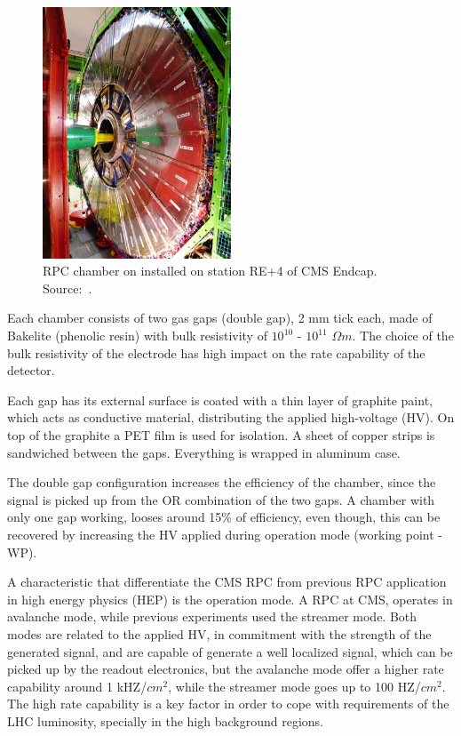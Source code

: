 \begin{figure}[h]
    \begin{center}
    \includegraphics[width=0.5\textwidth,keepaspectratio]{figures_and_tables/rpc/picture_rpc.jpg}
    \end{center}
    \caption{RPC chamber on installed on station RE+4 of CMS Endcap. Source:~\cite{rpc_picture}.}
    \label{picture_rpc}
\end{figure}


Each chamber consists of two gas gaps (double gap), 2 mm tick each, made of Bakelite (phenolic resin) with bulk resistivity of $10^{10}$ - $10^{11}$ $\Omega m$. The choice of the bulk resistivity of the electrode has high impact on the rate capability of the detector.

Each gap has its external surface is coated with a thin layer of graphite paint, which acts as conductive material, distributing the applied high-voltage (HV). On top of the graphite a PET film is used for isolation. A sheet of copper strips is sandwiched between the gaps. Everything is wrapped in aluminum case.

The double gap configuration increases the efficiency of the chamber, since the signal is picked up from the OR combination of the two gaps. A chamber with only one gap working, looses around 15\% of efficiency, even though, this can be recovered by increasing the HV applied during operation mode (working point - WP).

A characteristic that differentiate the CMS RPC from previous RPC application in high energy physics (HEP) is the operation mode. A RPC at CMS, operates in avalanche mode, while previous experiments used the streamer mode. Both modes are related to the applied HV, in commitment with the strength of the generated signal, and are capable of generate a well localized signal, which can be picked up by the readout electronics, but the avalanche mode offer a higher rate capability around 1 kHZ/$cm^2$, while the streamer mode goes up to 100 HZ/$cm^2$. The high rate capability is a key factor in order to cope with requirements of the LHC luminosity, specially in the high background regions.

